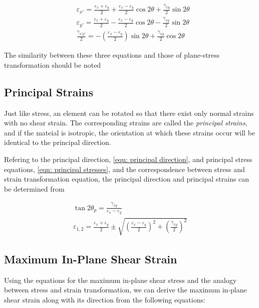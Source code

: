 \documentclass[
10pt,
a4paper,
openany,
svgnames,
]{book} %
\begin{document}
\begin{align}
  &\varepsilon_{x'} = \frac{\varepsilon_x + \varepsilon_y}{2} + \frac{\varepsilon_x - \varepsilon_y}{2}\cos 2\theta + \frac{\gamma_{xy}}{2}\sin 2\theta \\[10pt]
  &\varepsilon_{y'} = \frac{\varepsilon_x + \varepsilon_y}{2} - \frac{\varepsilon_x - \varepsilon_y}{2}\cos 2\theta - \frac{\gamma_{xy}}{2}\sin 2\theta \\[10pt]
  &\frac{\gamma_{x'y'}}{2} = -\left( \frac{\varepsilon_x - \varepsilon_y}{2} \right) \sin 2\theta + \frac{\gamma_{xy}}{2} \cos 2\theta
\end{align}

The similarity between these three equations and those of plane-stress transformation should be noted

\subsection{Principal Strains}

Just like stress, an element can be rotated so that there exist only normal strains with no shear strain. The corresponding strains are called the \emph{principal strains}, and if the mateial is isotropic, the orientation at which these strains occur will be identical to the principal direction.

Refering to the principal direction, \cref{eqn: principal direction}, and principal stress equations, \cref{eqn: principal stresses}, and the correspondence between stress and strain transformation equation, the principal direction and principal strains can be determined from

\begin{gather}
  \tan 2\theta_p = \frac{\gamma_{xy}}{\varepsilon_x - \varepsilon_y} \\[10pt]
  \varepsilon_{1,2} = \frac{\varepsilon_x + \varepsilon_y}{2} \pm \sqrt{ \left( \frac{\varepsilon_x - \varepsilon_y}{2} \right)^2 + \left( \frac{\gamma_{xy}}{2} \right)^2 }
\end{gather}

\subsection{Maximum In-Plane Shear Strain}

Using the equations for the maximum in-plane shear stress and the analogy between stress and strain transformation, we can derive the maximum in-plane shear strain along with its direction from the following equations:
\end{document}
